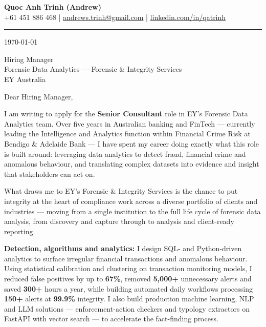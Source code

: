 \documentclass[11pt, a4paper]{letter}
\begin{document}
\begin{center}
    {\LARGE \textbf{Quoc Anh Trinh (Andrew)}}\\[4pt]
    {\small
        +61 451 886 468 \quad|\quad
        \href{mailto:andrews.trinh@gmail.com}{andrews.trinh@gmail.com} \quad|\quad
        \href{https://www.linkedin.com/in/qatrinh}{linkedin.com/in/qatrinh}
    }
\end{center}

\vspace{6pt}
\hrule
\vspace{10pt}

\today

\vspace{8pt}

Hiring Manager\\
Forensic Data Analytics --- Forensic \& Integrity Services\\
EY Australia

\vspace{6pt}

Dear Hiring Manager,

I am writing to apply for the \textbf{Senior Consultant} role in EY's Forensic Data Analytics team. Over five years in Australian banking and FinTech --- currently leading the Intelligence and Analytics function within Financial Crime Risk at Bendigo \& Adelaide Bank --- I have spent my career doing exactly what this role is built around: leveraging data analytics to detect fraud, financial crime and anomalous behaviour, and translating complex datasets into evidence and insight that stakeholders can act on.

What draws me to EY's Forensic \& Integrity Services is the chance to put integrity at the heart of compliance work across a diverse portfolio of clients and industries --- moving from a single institution to the full life cycle of forensic data analysis, from discovery and capture through to analysis and client-ready reporting.

\textbf{Detection, algorithms and analytics:}
I design SQL- and Python-driven analytics to surface irregular financial transactions and anomalous behaviour. Using statistical calibration and clustering on transaction monitoring models, I reduced false positives by up to \textbf{67\%}, removed \textbf{5{,}000+} unnecessary alerts and saved \textbf{300+} hours a year, while building automated daily workflows processing \textbf{150+} alerts at \textbf{99.9\%} integrity. I also build production machine learning, NLP and LLM solutions --- enforcement-action checkers and typology extractors on FastAPI with vector search --- to accelerate the fact-finding process.
\end{document}

